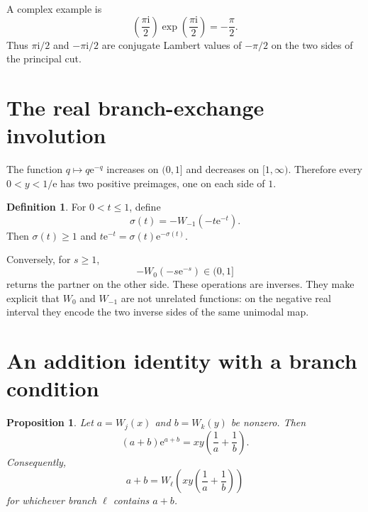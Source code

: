 \documentclass[11pt,oneside]{book}
\newtheorem{proposition}[theorem]{Proposition}
\theoremstyle{definition}
\newtheorem{definition}[theorem]{Definition}
\theoremstyle{remark}
\newcommand{\ee}{\mathrm e}
\newcommand{\ii}{\mathrm i}
\begin{document}
A complex example is
\begin{equation}\label{eq:complexspecial}
 \left(\frac{\pi\ii}{2}\right)
 \exp\!\left(\frac{\pi\ii}{2}\right)=-\frac\pi2.
\end{equation}
Thus $\pi\ii/2$ and $-\pi\ii/2$ are conjugate Lambert values of $-\pi/2$ on
the two sides of the principal cut.

\section{The real branch-exchange involution}

The function $q\mapsto q\ee^{-q}$ increases on $(0,1]$ and decreases on
$[1,\infty)$.  Therefore every $0<y<1/\ee$ has two positive preimages, one on
each side of $1$.

\begin{definition}
For $0<t\le1$, define
\begin{equation}\label{eq:branchinvolution}
 \sigma(t)=-W_{-1}(-t\ee^{-t}).
\end{equation}
Then $\sigma(t)\ge1$ and
$t\ee^{-t}=\sigma(t)\ee^{-\sigma(t)}$.
\end{definition}

Conversely, for $s\ge1$,
\begin{equation}\label{eq:branchinvolutioninverse}
 -W_0(-s\ee^{-s})\in(0,1]
\end{equation}
returns the partner on the other side.  These operations are inverses.  They
make explicit that $W_0$ and $W_{-1}$ are not unrelated functions: on the
negative real interval they encode the two inverse sides of the same unimodal
map.

\section{An addition identity with a branch condition}

\begin{proposition}\label{prop:additionidentity}
Let $a=W_j(x)$ and $b=W_k(y)$ be nonzero.  Then
\begin{equation}\label{eq:additionidentity}
 (a+b)\ee^{a+b}
 =xy\left(\frac1a+\frac1b\right).
\end{equation}
Consequently,
\begin{equation}\label{eq:additionW}
 a+b=W_\ell\!\left(
 xy\left(\frac1a+\frac1b\right)\right)
\end{equation}
for whichever branch $\ell$ contains $a+b$.
\end{proposition}
\end{document}

